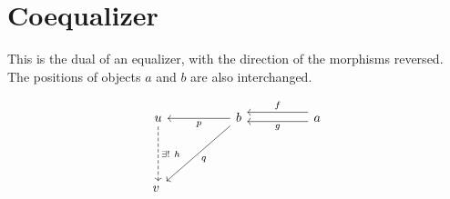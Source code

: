 \documentclass[uplatex,a4j,12pt,dvipdfmx]{jsarticle}
\begin{document}
\section{Coequalizer}

This is the dual of an equalizer, with the direction of the morphisms reversed. The positions of objects $a$ and $b$ are also interchanged.

\[
	\begin{tikzcd}
		u \arrow[dd, "\exists ! \ h", dashed] && b \arrow[ll, "p"] \arrow[lldd, "q"] && a \arrow[ll, "f"', shift right=2] \arrow[ll, "g", shift left] \\
		&& && \\
		v && &&
	\end{tikzcd}
\]
\end{document}
